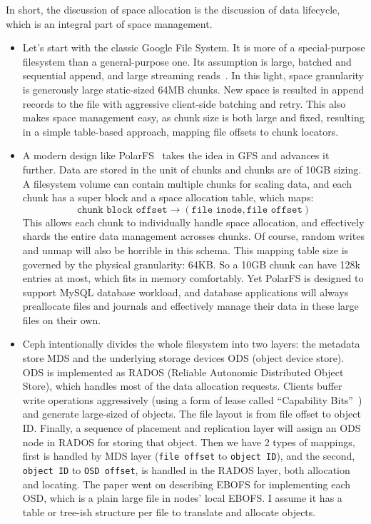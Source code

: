 In short, the discussion of space allocation is the discussion of data
lifecycle, which is an integral part of space management.

\begin{itemize}
    \item Let's start with the classic Google File System. It is more of a
    special-purpose filesystem than a general-purpose one. Its assumption is
    large, batched and sequential append, and large streaming
    reads~\cite{ghemawat2003google}. In this light, space granularity is
    generously large static-sized 64MB chunks. New space is resulted in
    append records to the file with aggressive client-side batching and
    retry. This also makes space management easy, as chunk size is both large
    and fixed, resulting in a simple table-based approach, mapping file
    offsets to chunk locators.

    \item A modern design like PolarFS~\cite{cao2018polarfs} takes the idea in
    GFS and advances it further. Data are stored in the unit of chunks and chunks
    are of 10GB sizing. A filesystem volume can contain multiple chunks for scaling
    data, and each chunk has a super block and a space allocation table, which maps:
    \[
        \texttt{chunk block offset} \rightarrow (\texttt{file inode}, \texttt{file offset})
    \]
    This allows each chunk to individually handle space allocation, and
    effectively shards the entire data management acrosses chunks. Of course,
    random writes and unmap will also be horrible in this schema. This
    mapping table size is governed by the physical granularity: 64KB. So a
    10GB chunk can have 128k entries at most, which fits in memory
    comfortably. Yet PolarFS is designed to support MySQL database workload,
    and database applications will always preallocate files and journals and
    effectively manage their data in these large files on their own.

    \item Ceph intentionally divides the whole filesystem into two layers: the
    metadata store MDS and the underlying storage devices ODS (object device
    store). ODS is implemented as RADOS (Reliable Autonomic Distributed
    Object Store), which handles most of the data allocation requests.
    Clients buffer write operations aggressively (using a form of lease
    called ``Capability Bits''~\cite{weil2006ceph}) and generate large-sized
    of objects. The file layout is from file offset to object ID. Finally, a
    sequence of placement and replication layer will assign an ODS node in
    RADOS for storing that object. Then we have 2 types of mappings, first is
    handled by MDS layer (\texttt{file offset} to \texttt{object ID}), and
    the second, \texttt{object ID} to \texttt{OSD offset}, is handled in the
    RADOS layer, both allocation and locating. The paper went on describing
    EBOFS for implementing each OSD, which is a plain large file in nodes'
    local EBOFS. I assume it has a table or tree-ish structure per file to
    translate and allocate objects.


\end{itemize}
